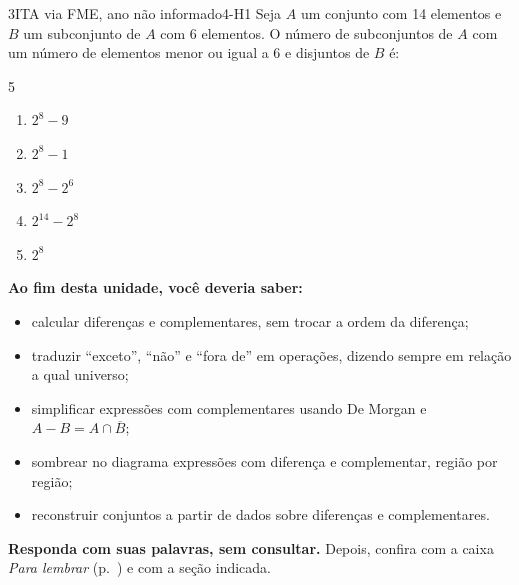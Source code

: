 \begin{questao}[integradora]{3}{ITA via FME, ano não informado}{4-H1}\label{u4:ita40}
Seja $A$ um conjunto com 14 elementos e $B$ um subconjunto de $A$ com 6 elementos. O número de subconjuntos de $A$ com um número de elementos menor ou igual a 6 e disjuntos de $B$ é:
\begin{multicols}{5}
\begin{enumerate}[label=\alph*)]
  \item $2^{8}-9$
  \item $2^{8}-1$
  \item $2^{8}-2^{6}$
  \item $2^{14}-2^{8}$
  \item $2^{8}$
\end{enumerate}
\end{multicols}
\end{questao}

\begin{sintese}
\textbf{Ao fim desta unidade, você deveria saber:}
\begin{itemize}[leftmargin=1.4em,itemsep=1pt]
  \item calcular diferenças e complementares, sem trocar a ordem da diferença;
  \item traduzir \enquote{exceto}, \enquote{não} e \enquote{fora de} em operações, dizendo sempre em relação a qual universo;
  \item simplificar expressões com complementares usando De Morgan e $A-B=A\cap\overline{B}$;
  \item sombrear no diagrama expressões com diferença e complementar, região por região;
  \item reconstruir conjuntos a partir de dados sobre diferenças e complementares.
\end{itemize}
\smallskip\noindent\textbf{Responda com suas palavras, sem consultar.} Depois, confira com a caixa \emph{Para lembrar} (p.~\pageref{lembrar-u4}) e com a seção indicada.
\begin{enumerate}[label=\arabic*.,leftmargin=1.4em]
\end{enumerate}
\end{sintese}

\Respostas
{\small{}}
